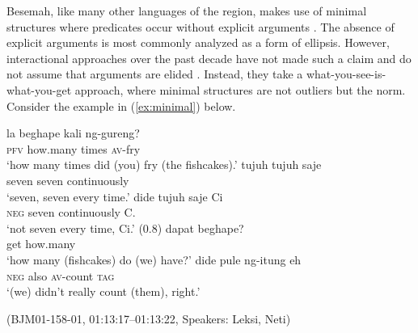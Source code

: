 \documentclass[output=paper,
\ChapterDOI{10.5281/zenodo.15697583}
colorlinks,
citecolor=brown]{langscibook}
\begin{document}
Besemah, like many other languages of the region, makes use of minimal structures where predicates occur without explicit arguments \citep{mcdonnell2016symmetrical}. The absence of explicit arguments is most commonly analyzed as a form of ellipsis. However, interactional approaches over the past decade have not made such a claim and do not assume that arguments are elided \citep[see][]{ewing2019predicate}. Instead, they take a what-you-see-is-what-you-get approach, where minimal structures are not outliers but the norm. Consider the example in (\ref{ex:minimal}) below. 


\begin{exe}
    \ex\label{ex:minimal} 
    \begin{xlist}[0\quad L:]
        \gll la beghape kali ng-gureng?\\
        \textsc{pfv} how.many times \textsc{av}-fry\\
        \trans `how many times did (you) fry (the fishcakes).'
        \exi{2\quad \hphantom{L:}} 
        \gll tujuh tujuh saje\\
        seven seven continuously\\
        \trans `seven, seven every time.'
        \gll dide tujuh saje Ci\\
        \textsc{neg} seven continuously C.\\
        \trans `not seven every time, Ci.'
        \exi{} (0.8)
        \exi{4\quad \hphantom{N:}} 
        \gll dapat beghape?\\
        get how.many\\
        \trans `how many (fishcakes) do (we) have?'
        \exi{5\quad \hphantom{N:}} 
        \gll dide pule ng-itung eh\\
        \textsc{neg} also \textsc{av}-count \textsc{tag}\\
        \trans `(we) didn't really count (them), right.'
    \end{xlist}
    \hfill (BJM01-158-01, 01:13:17–01:13:22, Speakers: Leksi, Neti)
\end{exe}
\end{document}

